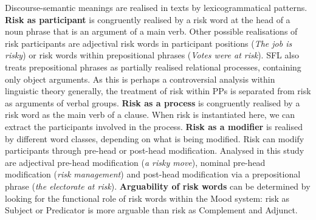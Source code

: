 			Discourse-semantic meanings are realised in texts by lexicogrammatical patterns. \textbf{Risk as participant} is congruently realised by a risk word at the head of a noun phrase that is an argument of a main verb. Other possible realisations of risk participants are adjectival risk words in participant positions (\emph{The job is risky}) or risk words within prepositional phrases (\emph{Votes were at risk}). SFL also treats prepositional phrases as partially realised relational processes, containing only object arguments. As this is perhaps a controversial analysis within linguistic theory generally, the treatment of risk within PPs is separated from risk as arguments of verbal groups. \textbf{Risk as a process} is congruently realised by a risk word as the main verb of a clause. When risk is instantiated here, we can extract the participants involved in the process. \textbf{Risk as a modifier} is realised by different word classes, depending on what is being modified. Risk can modify participants through pre-head or post-head modification. Analysed in this study are adjectival pre-head modification (\emph{a risky move}), nominal pre-head modification (\emph{risk management}) and post-head modification via a prepositional phrase (\emph{the electorate at risk}). \textbf{Arguability of risk words} can be determined by looking for the functional role of risk words within the Mood system: risk as Subject or Predicator is more arguable than risk as Complement and Adjunct. 



